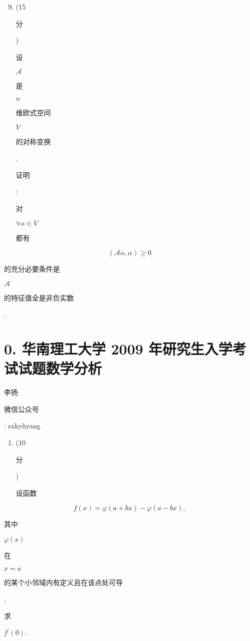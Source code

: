 \documentclass[10pt]{article}
\begin{document}
\begin{enumerate}
  \setcounter{enumi}{8}
  \item (15 \begin{CJK}{UTF8}{mj}分\end{CJK}) \begin{CJK}{UTF8}{mj}设\end{CJK} $\mathscr{A}$ \begin{CJK}{UTF8}{mj}是\end{CJK} $n$ \begin{CJK}{UTF8}{mj}维欧式空间\end{CJK} $V$ \begin{CJK}{UTF8}{mj}的对称变换\end{CJK}. \begin{CJK}{UTF8}{mj}证明\end{CJK}: \begin{CJK}{UTF8}{mj}对\end{CJK} $\forall \alpha \in V$ \begin{CJK}{UTF8}{mj}都有\end{CJK}
\end{enumerate}
$$
(\mathscr{A} \alpha, \alpha) \geq 0
$$
\begin{CJK}{UTF8}{mj}的充分必要条件是\end{CJK} $\mathscr{A}$ \begin{CJK}{UTF8}{mj}的特征值全是非负实数\end{CJK}.

\section{0. 华南理工大学 2009 年研究生入学考试试题数学分析}
\begin{CJK}{UTF8}{mj}李扬\end{CJK}

\begin{CJK}{UTF8}{mj}微信公众号\end{CJK}: sxkyliyang

\begin{enumerate}
  \item (10 \begin{CJK}{UTF8}{mj}分\end{CJK}) \begin{CJK}{UTF8}{mj}设函数\end{CJK}
\end{enumerate}
$$
f(x)=\varphi(a+b x)-\varphi(a-b x),
$$
\begin{CJK}{UTF8}{mj}其中\end{CJK} $\varphi(x)$ \begin{CJK}{UTF8}{mj}在\end{CJK} $x=a$ \begin{CJK}{UTF8}{mj}的某个小邻域内有定义且在该点处可导\end{CJK}, \begin{CJK}{UTF8}{mj}求\end{CJK} $f^{\prime}(0)$.
\end{document}
